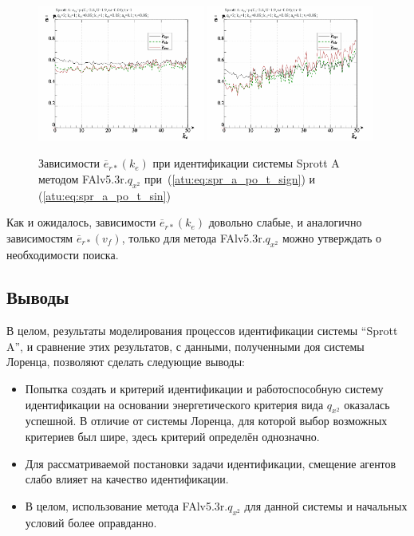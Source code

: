 \begin{figure}[h!]
  \centerline{
    \includegraphics[width=0.49\textwidth]{p/cha/spr_a/FAlv5.3A/sprott_a_FAlv5x3r-p_ke_e_sign.png}
    \hfill
    \includegraphics[width=0.49\textwidth]{p/cha/spr_a/FAlv5.3A/sprott_a_FAlv5x3r-p_ke_e_sin.png}
  }
  \caption{Зависимости $\overline{e}_{r*}(k_e)$ при идентификации системы Sprott A методом FAlv5.3r.$q_{x^2}$
   при~(\ref{atu:eq:spr_a_po_t_sign}) и (\ref{atu:eq:spr_a_po_t_sin})}
  \label{atu:f:spr_a_k_e_FAlv5.3r.q_x2}
\end{figure}

Как и ожидалось, зависимости $\overline{e}_{r*}(k_e)$
довольно слабые, и аналогично зависимостям  $\overline{e}_{r*}(v_f)$,
только для метода FAlv5.3r.$q_{x^2}$ можно
утверждать о необходимости поиска.


\subsection{Выводы}

В целом, результаты моделирования процессов идентификации системы ``Sprott A'',
и сравнение этих результатов, с данными, полученными
доя системы Лоренца, позволяют сделать следующие выводы:

\begin{itemize}

  \item
    Попытка создать и критерий идентификации и работоспособную систему идентификации
    на основании энергетического критерия вида $q_{x^2}$ оказалась успешной. В отличие
    от системы Лоренца, для которой выбор возможных критериев был шире,
    здесь критерий определён однозначно.

  \item
    Для рассматриваемой постановки задачи идентификации,
    смещение агентов слабо влияет на качество идентификации.

  \item
    В целом, использование метода  FAlv5.3r.$q_{x^2}$ для данной системы
    и начальных условий более оправданно.

\end{itemize}




